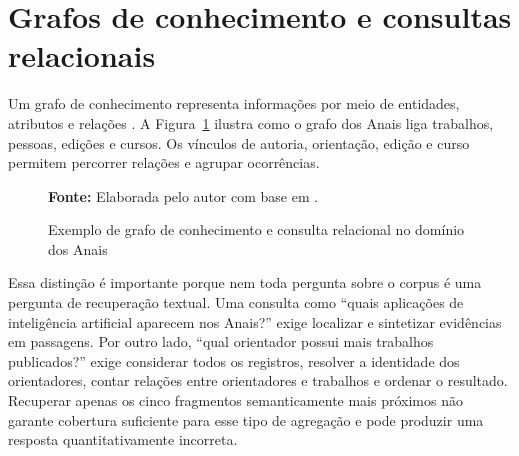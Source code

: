 \section{Grafos de conhecimento e consultas relacionais}

Um grafo de conhecimento representa informações por meio de entidades, atributos e relações \cite{hogan2021knowledgegraphs}. A Figura~\ref{fig:grafo-conhecimento} ilustra como o grafo dos Anais liga trabalhos, pessoas, edições e cursos. Os vínculos de autoria, orientação, edição e curso permitem percorrer relações e agrupar ocorrências.

\begin{figure}[!htbp]
\centering
\begin{minipage}{0.90\textwidth}
\caption{Exemplo de grafo de conhecimento e consulta relacional no domínio dos Anais}
\label{fig:grafo-conhecimento}
\par\smallskip
{\footnotesize\raggedright\textbf{Fonte:} Elaborada pelo autor com base em \cite{hogan2021knowledgegraphs}.\par}
\end{minipage}
\end{figure}

Essa distinção é importante porque nem toda pergunta sobre o corpus é uma pergunta de recuperação textual. Uma consulta como ``quais aplicações de inteligência artificial aparecem nos Anais?'' exige localizar e sintetizar evidências em passagens. Por outro lado, ``qual orientador possui mais trabalhos publicados?'' exige considerar todos os registros, resolver a identidade dos orientadores, contar relações entre orientadores e trabalhos e ordenar o resultado. Recuperar apenas os cinco fragmentos semanticamente mais próximos não garante cobertura suficiente para esse tipo de agregação e pode produzir uma resposta quantitativamente incorreta.

